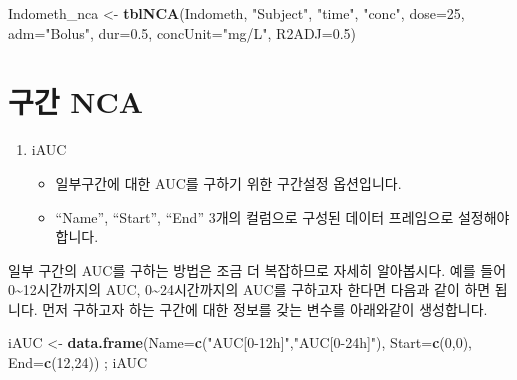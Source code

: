 \documentclass[12pt,]{krantz}
\newenvironment{Shaded}{\begin{snugshade}}{\end{snugshade}}
\newcommand{\DataTypeTok}[1]{\textcolor[rgb]{0.13,0.29,0.53}{#1}}
\newcommand{\DecValTok}[1]{\textcolor[rgb]{0.00,0.00,0.81}{#1}}
\newcommand{\FloatTok}[1]{\textcolor[rgb]{0.00,0.00,0.81}{#1}}
\newcommand{\KeywordTok}[1]{\textcolor[rgb]{0.13,0.29,0.53}{\textbf{#1}}}
\newcommand{\NormalTok}[1]{#1}
\newcommand{\StringTok}[1]{\textcolor[rgb]{0.31,0.60,0.02}{#1}}
\providecommand{\tightlist}{%
  \setlength{\itemsep}{0pt}\setlength{\parskip}{0pt}}
\begin{document}
\begin{Shaded}
\begin{Highlighting}[]
\NormalTok{Indometh_nca <-}\StringTok{ }\KeywordTok{tblNCA}\NormalTok{(Indometh, }\StringTok{"Subject"}\NormalTok{, }\StringTok{"time"}\NormalTok{, }\StringTok{"conc"}\NormalTok{, }
                       \DataTypeTok{dose=}\DecValTok{25}\NormalTok{, }\DataTypeTok{adm=}\StringTok{"Bolus"}\NormalTok{, }\DataTypeTok{dur=}\FloatTok{0.5}\NormalTok{, }\DataTypeTok{concUnit=}\StringTok{"mg/L"}\NormalTok{, }\DataTypeTok{R2ADJ=}\FloatTok{0.5}\NormalTok{)}
\end{Highlighting}
\end{Shaded}

\hypertarget{interval-NCA}{%
\section{구간 NCA}\label{interval-NCA}}

\begin{enumerate}
\def\labelenumi{\arabic{enumi}.}
\tightlist
\item
  iAUC

  \begin{itemize}
  \tightlist
  \item
    일부구간에 대한 AUC를 구하기 위한 구간설정 옵션입니다.
  \item
    ``Name'', ``Start'', ``End'' 3개의 컬럼으로 구성된 데이터 프레임으로 설정해야 합니다.
  \end{itemize}
\end{enumerate}

일부 구간의 AUC를 구하는 방법은 조금 더 복잡하므로 자세히 알아봅시다.
예를 들어 0\textasciitilde12시간까지의 AUC, 0\textasciitilde24시간까지의 AUC를 구하고자 한다면 다음과 같이 하면 됩니다.
먼저 구하고자 하는 구간에 대한 정보를 갖는 변수를 아래와같이 생성합니다.

\begin{Shaded}
\begin{Highlighting}[]
\NormalTok{iAUC <-}\StringTok{ }\KeywordTok{data.frame}\NormalTok{(}\DataTypeTok{Name=}\KeywordTok{c}\NormalTok{(}\StringTok{"AUC[0-12h]"}\NormalTok{,}\StringTok{"AUC[0-24h]"}\NormalTok{), }\DataTypeTok{Start=}\KeywordTok{c}\NormalTok{(}\DecValTok{0}\NormalTok{,}\DecValTok{0}\NormalTok{), }\DataTypeTok{End=}\KeywordTok{c}\NormalTok{(}\DecValTok{12}\NormalTok{,}\DecValTok{24}\NormalTok{)) ; iAUC}
\end{Highlighting}
\end{Shaded}
\end{document}
